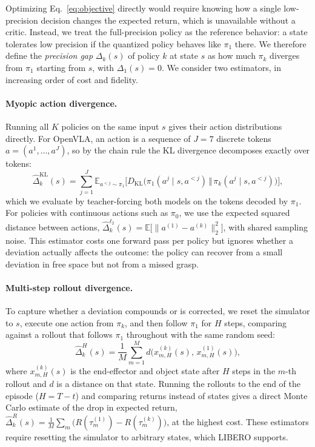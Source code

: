 \documentclass[11pt]{article}
\newcommand{\E}{\mathbb{E}}
\begin{document}
Optimizing Eq.~\eqref{eq:objective} directly would require knowing how
a single low-precision decision changes the expected return,
which is unavailable without a critic. Instead, we treat the
full-precision policy as the reference behavior: a state tolerates low
precision if the quantized policy behaves like $\pi_1$ there. We
therefore define the \emph{precision gap} $\Delta_k(s)$ of policy $k$
at state $s$ as how much $\pi_k$ diverges from $\pi_1$ starting from
$s$, with $\Delta_1(s) = 0$. We consider two estimators, in increasing
order of cost and fidelity.

\paragraph{Myopic action divergence.}
Running all $K$ policies on the same input $s$ gives their action
distributions directly. For OpenVLA, an action is a sequence of
$J = 7$ discrete tokens $a = (a^1, \dots, a^J)$, so by the chain rule
the KL divergence decomposes exactly over tokens:
\begin{equation}
  \hat{\Delta}_k^{\mathrm{KL}}(s) = \sum_{j=1}^{J}
  \E_{a^{<j} \sim \pi_1}\Big[ D_{\mathrm{KL}}\big(
  \pi_1(a^j \mid s, a^{<j}) \,\Vert\, \pi_k(a^j \mid s, a^{<j}) \big)\Big],
\end{equation}
which we evaluate by teacher-forcing both models on the tokens
decoded by $\pi_1$. For policies with continuous actions such as
$\pi_0$, we use the expected squared distance between actions,
$\hat{\Delta}_k^{\ell_2}(s) = \E\big[\lVert a^{(1)} - a^{(k)} \rVert_2^2\big]$,
with shared sampling noise. This estimator costs one forward pass per
policy but ignores whether a deviation actually affects the outcome:
the policy can recover from a small deviation in free space but not
from a missed grasp.

\paragraph{Multi-step rollout divergence.}
To capture whether a deviation compounds or is corrected, we reset the
simulator to $s$, execute one action from $\pi_k$, and then follow
$\pi_1$ for $H$ steps, comparing against a rollout that follows
$\pi_1$ throughout with the same random seed:
\begin{equation}
  \hat{\Delta}_k^{H}(s) = \frac{1}{M} \sum_{m=1}^{M}
  d\big(x^{(k)}_{m,H}(s),\, x^{(1)}_{m,H}(s)\big),
\end{equation}
where $x^{(k)}_{m,H}(s)$ is the end-effector and object state after
$H$ steps in the $m$-th rollout and $d$ is a distance on that state.
Running the rollouts to the end of the episode ($H = T - t$) and
comparing returns instead of states gives a direct Monte Carlo
estimate of the drop in expected return,
$\hat{\Delta}_k^{R}(s) = \frac{1}{M}\sum_{m}
\big(R(\tau_m^{(1)}) - R(\tau_m^{(k)})\big)$,
at the highest cost. These estimators require resetting the simulator
to arbitrary states, which LIBERO supports.
\end{document}
